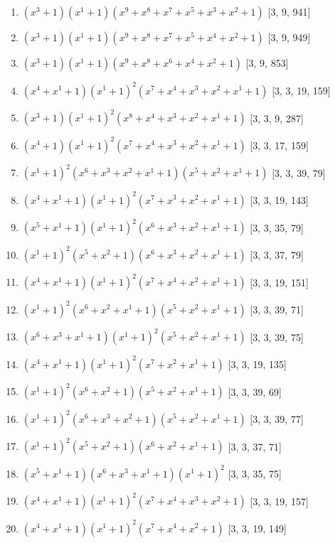 \documentclass[10pt,twocolumn]{article}
\begin{document}
\begin{enumerate}
\item $(x^{3} + 1)(x^{1} + 1)(x^{9} + x^{8} + x^{7} + x^{5} + x^{3} + x^{2} + 1)$  [3, 9, 941]
\item $(x^{3} + 1)(x^{1} + 1)(x^{9} + x^{8} + x^{7} + x^{5} + x^{4} + x^{2} + 1)$  [3, 9, 949]
\item $(x^{3} + 1)(x^{1} + 1)(x^{9} + x^{8} + x^{6} + x^{4} + x^{2} + 1)$  [3, 9, 853]
\item $(x^{4} + x^{1} + 1)(x^{1} + 1)^{2}(x^{7} + x^{4} + x^{3} + x^{2} + x^{1} + 1)$  [3, 3, 19, 159]
\item $(x^{3} + 1)(x^{1} + 1)^{2}(x^{8} + x^{4} + x^{3} + x^{2} + x^{1} + 1)$  [3, 3, 9, 287]
\item $(x^{4} + 1)(x^{1} + 1)^{2}(x^{7} + x^{4} + x^{3} + x^{2} + x^{1} + 1)$  [3, 3, 17, 159]
\item $(x^{1} + 1)^{2}(x^{6} + x^{3} + x^{2} + x^{1} + 1)(x^{5} + x^{2} + x^{1} + 1)$  [3, 3, 39, 79]
\item $(x^{4} + x^{1} + 1)(x^{1} + 1)^{2}(x^{7} + x^{3} + x^{2} + x^{1} + 1)$  [3, 3, 19, 143]
\item $(x^{5} + x^{1} + 1)(x^{1} + 1)^{2}(x^{6} + x^{3} + x^{2} + x^{1} + 1)$  [3, 3, 35, 79]
\item $(x^{1} + 1)^{2}(x^{5} + x^{2} + 1)(x^{6} + x^{3} + x^{2} + x^{1} + 1)$  [3, 3, 37, 79]
\item $(x^{4} + x^{1} + 1)(x^{1} + 1)^{2}(x^{7} + x^{4} + x^{2} + x^{1} + 1)$  [3, 3, 19, 151]
\item $(x^{1} + 1)^{2}(x^{6} + x^{2} + x^{1} + 1)(x^{5} + x^{2} + x^{1} + 1)$  [3, 3, 39, 71]
\item $(x^{6} + x^{3} + x^{1} + 1)(x^{1} + 1)^{2}(x^{5} + x^{2} + x^{1} + 1)$  [3, 3, 39, 75]
\item $(x^{4} + x^{1} + 1)(x^{1} + 1)^{2}(x^{7} + x^{2} + x^{1} + 1)$  [3, 3, 19, 135]
\item $(x^{1} + 1)^{2}(x^{6} + x^{2} + 1)(x^{5} + x^{2} + x^{1} + 1)$  [3, 3, 39, 69]
\item $(x^{1} + 1)^{2}(x^{6} + x^{3} + x^{2} + 1)(x^{5} + x^{2} + x^{1} + 1)$  [3, 3, 39, 77]
\item $(x^{1} + 1)^{2}(x^{5} + x^{2} + 1)(x^{6} + x^{2} + x^{1} + 1)$  [3, 3, 37, 71]
\item $(x^{5} + x^{1} + 1)(x^{6} + x^{3} + x^{1} + 1)(x^{1} + 1)^{2}$  [3, 3, 35, 75]
\item $(x^{4} + x^{1} + 1)(x^{1} + 1)^{2}(x^{7} + x^{4} + x^{3} + x^{2} + 1)$  [3, 3, 19, 157]
\item $(x^{4} + x^{1} + 1)(x^{1} + 1)^{2}(x^{7} + x^{4} + x^{2} + 1)$  [3, 3, 19, 149]

\end{enumerate}
\end{document}
